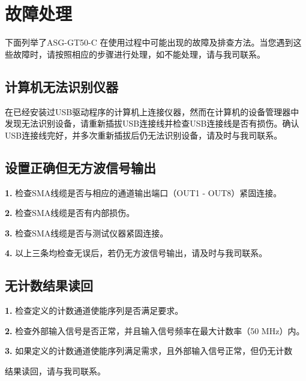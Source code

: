 \chapter{\heiti 故障处理}
下面列举了ASG-GT50-C 在使用过程中可能出现的故障及排查方法。当您遇到这些故障时，请按照相应的步骤进行处理，如不能处理，请与我司联系。

\section{\heiti 计算机无法识别仪器}
在已经安装过USB驱动程序的计算机上连接仪器，然而在计算机的设备管理器中发现无法识别设备，请重新插拔USB连接线并检查USB连接线是否有损伤。确认USB连接线完好，并多次重新插拔后仍无法识别设备，请及时与我司联系。

\section{\heiti 设置正确但无方波信号输出}
\noindent \textbf{1.} 检查SMA线缆是否与相应的通道输出端口（OUT1 - OUT8）紧固连接。

\noindent \textbf{2.} 检查SMA线缆是否有内部损伤。

\noindent \textbf{3.} 检查SMA线缆是否与测试仪器紧固连接。

\noindent \textbf{4.} 以上三条均检查无误后，若仍无方波信号输出，请及时与我司联系。


\section{\heiti 无计数结果读回}
\noindent \textbf{1.} 检查定义的计数通道使能序列是否满足要求。

\noindent \textbf{2.} 检查外部输入信号是否正常，并且输入信号频率在最大计数率（50 MHz）内。

\noindent \textbf{3.} 如果定义的计数通道使能序列满足需求，且外部输入信号正常，但仍无计数

\hspace{-1em}结果读回，请与我司联系。

